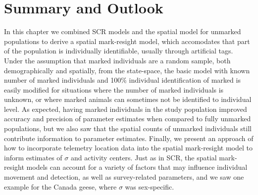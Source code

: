 



\section{Summary and Outlook}

In this chapter we combined SCR models and the spatial model for
unmarked populations to derive a spatial mark-resight model, which
accomodates that part of the population is individually identifiable,
usually through artificial tags. Under the assumption that marked
individuals are a random sample, both demographically and spatially,
from the state-space, the basic model with known number of marked
individuals and 100\% individual identification of marked is easily
modified for situations where the number of marked individuals is
unknown, or where marked animals can sometimes not be identified to
individual level. As expected, having marked individuals in the study
population improved accuracy and precision of parameter estimates when
compared to fully unmarked populations, but we also saw that the
spatial counts of unmarked individuals still contribute information to
parameter estimates. Finally, we present an approach of how to
incorporate telemetry location data into the spatial mark-resight
model to inform estimates of $\sigma$ and activity centers. Just as in
SCR, the spatial mark-resight models can account for a variety of
factors that may influence individual movement and detection, as well
as survey-related parameters, and we saw one example for the Canada
geese, where $\sigma$ was sex-specific.

